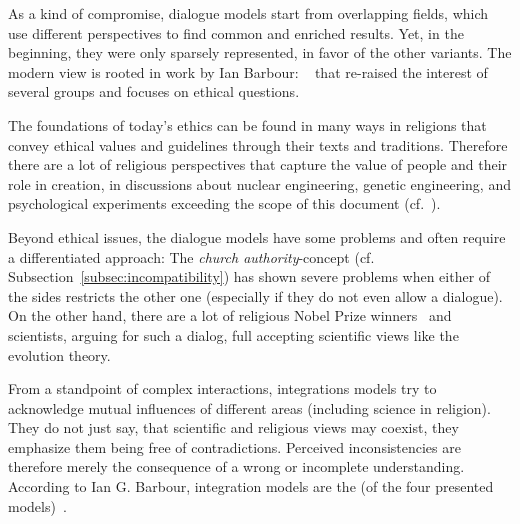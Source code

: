 As a kind of compromise, dialogue models start from overlapping fields, which use different perspectives to find common and enriched results.
Yet, in the beginning, they were only sparsely represented, in favor of the other variants.
The modern view is rooted in work by Ian Barbour: ~\cite{barbour1976myths} that re-raised the interest of several groups and focuses on ethical questions.

The foundations of today's ethics can be found in many ways in religions that convey ethical values and guidelines through their texts and traditions.
Therefore there are a lot of religious perspectives that capture the value of people and their role in creation, in discussions about nuclear engineering, genetic engineering, and psychological experiments exceeding the scope of this document (cf.~\cite{barbour1993ethics,reiss2001improving}).

Beyond ethical issues, the dialogue models have some problems and often require a differentiated approach:
The \emph{church authority}-concept (cf. Subsection~\ref{subsec:incompatibility}) has shown severe problems when either of the sides restricts the other one (especially if they do not even allow a dialogue).
On the other hand, there are a lot of religious Nobel Prize winners~\cite{shalev2002100} and scientists, arguing for such a dialog, full accepting scientific views like the evolution theory.



From a standpoint of complex interactions, integrations models try to acknowledge mutual influences of different areas (including science in religion).
They do not just say, that scientific and religious views may coexist, they emphasize them being free of contradictions.
Perceived inconsistencies are therefore merely the consequence of a wrong or incomplete understanding.
According to Ian G. Barbour, integration models are the  (of the four presented models)~\cite[p.~2]{Barbour2002}.




